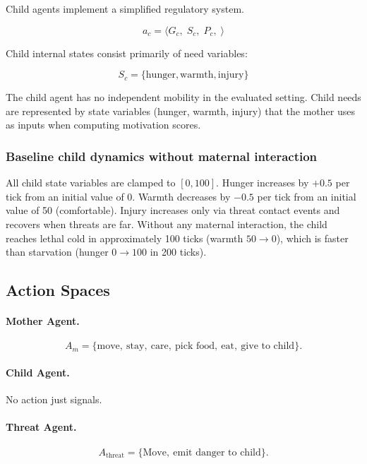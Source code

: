Child agents implement a simplified regulatory system.

\[
a_c =
\langle
G_c,\;
S_c,\;
P_c,\;
\rangle
\]

Child internal states consist primarily of need variables:

\[
S_c =
\{\text{hunger},\text{warmth},\text{injury}\}
\]

The child agent has no independent mobility in the evaluated setting. Child needs are represented by state variables (hunger, warmth, injury) that the mother uses as inputs when computing motivation scores.

\subsubsection{Baseline child dynamics without maternal interaction}
All child state variables are clamped to $[0,100]$. Hunger increases by $+0.5$ per tick from an initial value of 0. Warmth decreases by $-0.5$ per tick from an initial value of 50 (comfortable). Injury increases only via threat contact events and recovers when threats are far. Without any maternal interaction, the child reaches lethal cold in approximately 100 ticks (warmth $50 \rightarrow 0$), which is faster than starvation (hunger $0 \rightarrow 100$ in 200 ticks).






\subsection{Action Spaces}

\paragraph{Mother Agent.}
\[
A_m = \{
\text{move},\ 
\text{stay},\
\text{care},\
\text{pick food},\
\text{eat},\
\text{give to child}
\}.
\]

\paragraph{Child Agent.}
No action just signals.

\paragraph{Threat Agent.}
\[
A_{\text{threat}} = \{
\text{Move},\ 
\text{emit danger to child}
\}.
\]





